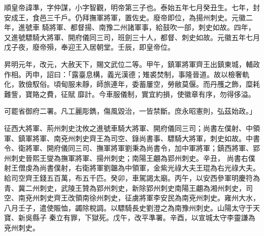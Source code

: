 
\begin{pinyinscope}

 順皇帝諱準，字仲謀，小字智觀，明帝第三子也。泰始五年七月癸丑生。七年，封安成王，食邑三千戶。仍拜撫軍將軍，置佐史。廢帝即位，為揚州刺史。元徽二年，進號車
 騎將軍、都督揚、南豫二州諸軍事，給鼓吹一部，刺史如故。四年，又進號驃騎大將軍、開府儀同三司，班劍三十人，都督、刺史如故。元徽五年七月戊子夜，廢帝殞，奉迎王入居朝堂。壬辰，即皇帝位。



 昇明元年，改元，大赦天下，賜文武位二等。甲午，鎮軍將軍齊王出鎮東城，輔政作相。丙申，詔曰：「露臺息構，義光漢德；雉裘焚制，事隆晉道。故以檢奢軌化，敦儉馭俗。頃甸服未靜，師旅連年，委蓄屢空，勞敝莫偃。而丹雘之飾，糜耗難訾，寶賂之費，征賦
 靡計。今車服儀制，實宜約損，使徽章有序，勿得侈溢。



 可罷省御府二署。凡工麗彫鐫，傷風毀治，一皆禁斷。庶永昭憲則，弘茲始政。」



 征西大將軍、荊州刺史沈攸之進號車騎大將軍、開府儀同三司；尚書左僕射、中領軍、鎮軍將軍、南兗州刺史齊王為司空、錄尚書事、驃騎大將軍，刺史如故。中書令、衛將軍、開府儀同三司、撫軍將軍劉秉為尚書令，加中軍將軍；鎮西將軍、郢州刺史晉熙王燮為撫軍將軍、揚州刺史；南陽王翽為郢州刺史。辛丑，
 尚書右僕射王僧虔為尚書僕射，右衛將軍劉韞為中領軍，金紫光祿大夫王琨為右光祿大夫。給司空齊王錢五百萬，布五千匹。癸卯，車駕謁太廟。丙午，以安西參軍明慶符為青、冀二州刺史，武陵王贊為郢州刺史，新除郢州刺史南陽王翽為湘州刺史，司空、南兗州刺史齊王改領南徐州刺史，征虜將軍李安民為南兗州刺史。雍州大水，八月壬子，遣使賑恤，蠲除稅調。以驃騎長史劉澄之為南豫州刺史。山陽太守于天寶、新吳縣子
 秦立有罪，下獄死。戊午，改平準署。辛酉，以宣城太守李靈謙為兗州刺史。




\end{pinyinscope}
